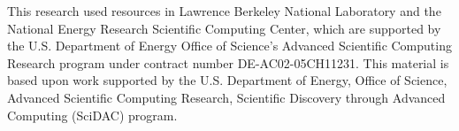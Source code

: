 \documentclass[conference]{IEEEtran}
\begin{document}
This research used resources in Lawrence Berkeley National Laboratory and the National Energy Research Scientific Computing Center, which are supported by the U.S. Department of Energy Office of Science's Advanced Scientific Computing Research program under contract number DE-AC02-05CH11231.  
This material is based upon work supported by the U.S. Department of Energy, Office of Science, Advanced Scientific Computing Research, Scientific Discovery through Advanced Computing (SciDAC) program.





% 
\end{document}
